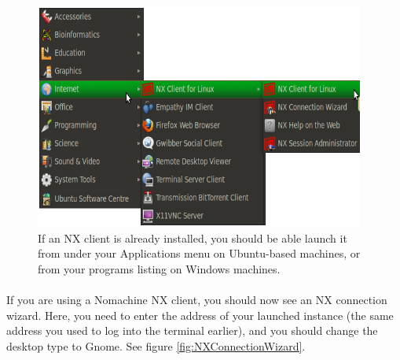 \begin{figure}[!hd]
	\fbox
	{
		\begin{minipage}{13cm}
\includegraphics[width=\maxwidth]{"images/NX-menuOnUbuntu"}
\caption[NX Client start]{\label{fig:NX-menuOnUbuntu}If an NX client is already installed, you should be able launch it from under your Applications menu on Ubuntu-based machines, or from your programs listing on Windows machines.}
		\end{minipage}
	}
\end{figure}

\paragraph{}If you are using a Nomachine NX client, you should now see an NX connection wizard. Here, you need to enter the address of your launched instance (the same address you used to log into the terminal earlier), and you should change the desktop type to Gnome. See figure \ref{fig:NXConnectionWizard}. 


